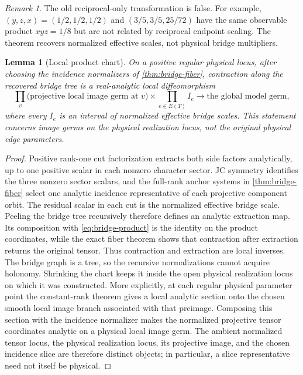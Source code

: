 \documentclass[11pt]{article}
\newtheorem{lemma}[theorem]{Lemma}
\theoremstyle{remark}
\newtheorem{remark}[theorem]{Remark}
\begin{document}
\begin{remark}
The old reciprocal-only transformation is false.  For example,
$(y,z,x)=(1/2,1/2,1/2)$ and $(3/5,3/5,25/72)$ have the same observable
product $xyz=1/8$ but are not related by reciprocal endpoint scaling.  The
theorem recovers normalized effective scales, not physical bridge
multipliers.
\end{remark}

\begin{lemma}[Local product chart]\label{lem:product-chart}
On a positive regular physical locus, after choosing the incidence
normalizers of \cref{thm:bridge-fiber}, contraction along the recovered bridge
tree is a real-analytic local diffeomorphism
\[
\prod_v \bigl(\text{projective local image germ at }v\bigr)
\times\prod_{e\in E(T)} I_e
\longrightarrow \text{the global model germ},
\]
where every $I_e$ is an interval of normalized effective bridge scales.
This statement concerns image germs on the physical realization locus, not
the original physical edge parameters.
\end{lemma}

\begin{proof}
Positive rank-one cut factorization extracts both side factors analytically,
up to one positive scalar in each nonzero character sector.  JC symmetry
identifies the three nonzero sector scalars, and the full-rank anchor systems
in \cref{thm:bridge-fiber} select one analytic incidence representative of
each projective component orbit.  The residual scalar in each cut is the
normalized effective bridge scale.  Peeling the bridge tree recursively
therefore defines an analytic extraction map.  Its composition with
\eqref{eq:bridge-product} is the identity on the product coordinates, while
the exact fiber theorem shows that contraction after extraction returns the
original tensor.  Thus contraction and extraction are local inverses.  The
bridge graph is a tree, so the recursive normalizations cannot acquire
holonomy.  Shrinking the chart keeps it inside the open physical realization
locus on which it was constructed.  More explicitly, at each regular
physical parameter point the constant-rank theorem gives a local analytic
section onto the chosen smooth local image branch associated with that
preimage.  Composing this section with the incidence normalizer makes the
normalized projective tensor coordinates analytic on a physical local image
germ.  The ambient normalized tensor locus, the physical realization locus,
its projective image, and the chosen incidence slice are therefore distinct
objects; in particular, a slice representative need not itself be physical.
\end{proof}
\end{document}
